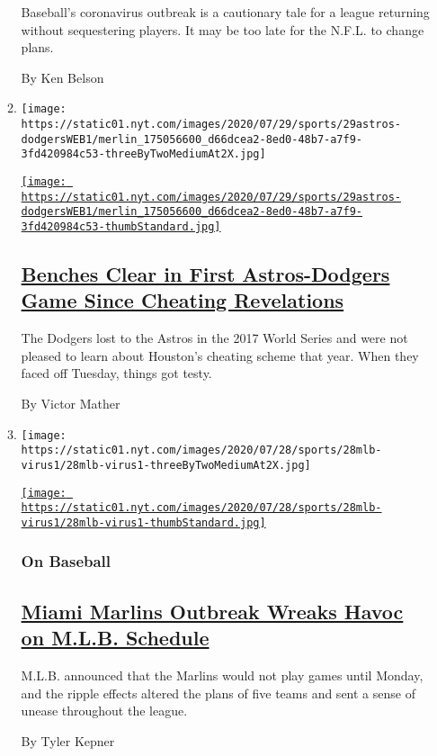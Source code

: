 \begin{enumerate}
\begin{enumerate}
    Baseball's coronavirus outbreak is a cautionary tale for a league
    returning without sequestering players. It may be too late for the
    N.F.L. to change plans.

    By Ken Belson
  \item
    \texttt{[image: https://static01.nyt.com/images/2020/07/29/sports/29astros-dodgersWEB1/merlin\_175056600\_d66dcea2-8ed0-48b7-a7f9-3fd420984c53-threeByTwoMediumAt2X.jpg]}

    \href{/2020/07/29/sports/baseball/dodgers-astros-fight.html}{\texttt{[image: https://static01.nyt.com/images/2020/07/29/sports/29astros-dodgersWEB1/merlin\_175056600\_d66dcea2-8ed0-48b7-a7f9-3fd420984c53-thumbStandard.jpg]}}

    \hypertarget{benches-clear-in-first-astros-dodgers-game-since-cheating-revelations}{%
    \subsection{\texorpdfstring{\href{/2020/07/29/sports/baseball/dodgers-astros-fight.html}{Benches
    Clear in First Astros-Dodgers Game Since Cheating
    Revelations}}{Benches Clear in First Astros-Dodgers Game Since Cheating Revelations}}\label{benches-clear-in-first-astros-dodgers-game-since-cheating-revelations}}

    The Dodgers lost to the Astros in the 2017 World Series and were not
    pleased to learn about Houston's cheating scheme that year. When
    they faced off Tuesday, things got testy.

    By Victor Mather
  \item
    \texttt{[image: https://static01.nyt.com/images/2020/07/28/sports/28mlb-virus1/28mlb-virus1-threeByTwoMediumAt2X.jpg]}

    \href{/2020/07/28/sports/baseball/marlins-outbreak-mlb-coronavirus.html}{\texttt{[image: https://static01.nyt.com/images/2020/07/28/sports/28mlb-virus1/28mlb-virus1-thumbStandard.jpg]}}

    \hypertarget{on-baseball}{%
    \subsubsection{On Baseball}\label{on-baseball}}

    \hypertarget{miami-marlins-outbreak-wreaks-havoc-on-mlb-schedule}{%
    \subsection{\texorpdfstring{\href{/2020/07/28/sports/baseball/marlins-outbreak-mlb-coronavirus.html}{Miami
    Marlins Outbreak Wreaks Havoc on M.L.B.
    Schedule}}{Miami Marlins Outbreak Wreaks Havoc on M.L.B. Schedule}}\label{miami-marlins-outbreak-wreaks-havoc-on-mlb-schedule}}

    M.L.B. announced that the Marlins would not play games until Monday,
    and the ripple effects altered the plans of five teams and sent a
    sense of unease throughout the league.

    By Tyler Kepner
  \end{enumerate}
\end{enumerate}

